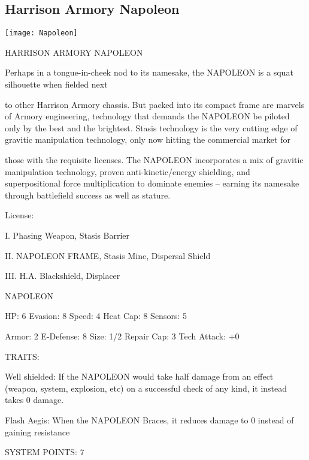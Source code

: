 \subsection{Harrison Armory Napoleon}

\begin{center}
    \texttt{[image: Napoleon]}
\end{center}

                             HARRISON ARMORY NAPOLEON

Perhaps in a tongue-in-cheek nod to its namesake, the NAPOLEON is a squat silhouette when fielded next

to other Harrison Armory chassis. But packed into its compact frame are marvels of Armory engineering,
technology that demands the NAPOLEON be piloted only by the best and the brightest. Stasis technology
is the very cutting edge of gravitic manipulation technology, only now hitting the commercial market for

those with the requisite licenses. The NAPOLEON incorporates a mix of gravitic manipulation technology,
proven anti-kinetic/energy shielding, and superpositional force multiplication to dominate enemies --
earning its namesake through battlefield success as well as stature.

                                                  License:

I. Phasing Weapon, Stasis Barrier

II. NAPOLEON FRAME, Stasis Mine, Dispersal Shield

III. H.A. Blackshield, Displacer


                                               NAPOLEON

 HP: 6          Evasion: 8                           Speed: 4           Heat Cap: 8       Sensors:  5

 Armor: 2       E-Defense: 8                         Size: 1/2          Repair Cap: 3     Tech Attack:
                                                                                          +0

                                                  TRAITS:

 Well shielded: If the NAPOLEON would take half damage from an effect (weapon, system, explosion,
 etc) on a successful check of any kind, it instead takes 0 damage.

 Flash Aegis: When the NAPOLEON Braces, it reduces damage to 0 instead of gaining resistance

                                            SYSTEM POINTS: 7

